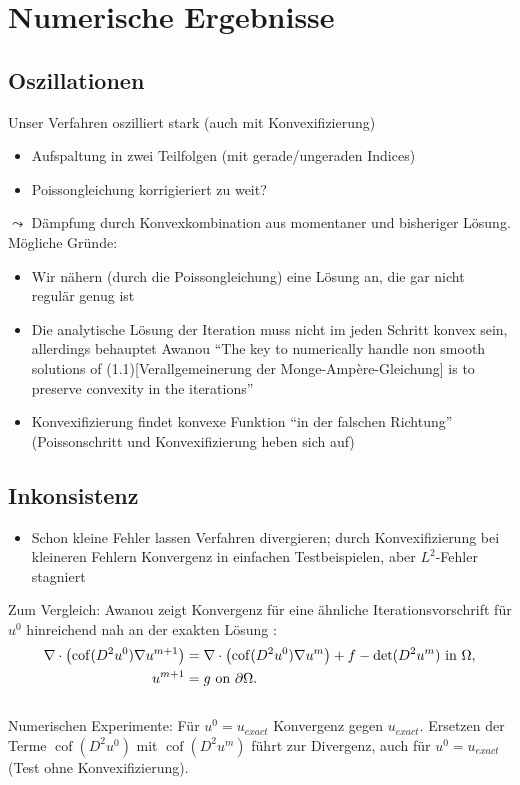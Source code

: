 \documentclass[a4paper,11pt]{article}
\newcommand{\cof}{\operatorname{cof}}
\begin{document}
\section*{Numerische Ergebnisse}

\subsection*{Oszillationen}

Unser Verfahren oszilliert stark (auch mit Konvexifizierung)
\begin{itemize}
	\item Aufspaltung in zwei Teilfolgen (mit gerade/ungeraden Indices)
	\item Poissongleichung korrigieriert zu weit?
\end{itemize}
 $\leadsto$ Dämpfung durch Konvexkombination aus momentaner und bisheriger Lösung.
Mögliche Gründe:
\begin{itemize}
	\item Wir nähern (durch die Poissongleichung) eine Lösung an, die gar nicht regulär genug ist
	\item Die analytische Lösung der Iteration muss nicht im jeden Schritt konvex sein, allerdings behauptet Awanou ``The key to numerically handle non smooth solutions	of (1.1)[Verallgemeinerung der Monge-Amp\`ere-Gleichung] is to preserve convexity in the iterations'' \cite{Awanou2014}
	\item Konvexifizierung findet konvexe Funktion ``in der falschen Richtung'' (Poissonschritt und Konvexifizierung heben sich auf)
\end{itemize}

\subsection*{Inkonsistenz}
\begin{itemize}
	\item Schon kleine Fehler lassen Verfahren divergieren; durch Konvexifizierung bei kleineren Fehlern Konvergenz in einfachen Testbeispielen, aber $L^2$-Fehler stagniert
\end{itemize}

Zum Vergleich: Awanou zeigt Konvergenz für eine ähnliche Iterationsvorschrift für $u^0$ hinreichend nah an der exakten Lösung \cite{Awanou2014}:
\begin{align*}
	\nabla \cdot \left( \cof(D^2 u^0) \nabla u^{m+1} \right) &= \nabla \cdot \left( \cof(D^2 u^0) \nabla u^{m} \right) + f - \operatorname{det} (D^2u^m) \textnormal{ in } \Omega, \\
	u^{m+1} &= g \textnormal{ on } \partial \Omega. 
\end{align*}
\\
Numerischen Experimente: Für $u^0=u_{exact}$  Konvergenz gegen $u_{exact}$. Ersetzen der Terme $\cof(D^2 u^0)$ mit $\cof(D^2 u^m)$ führt zur Divergenz, auch für $u^0=u_{exact}$ (Test ohne Konvexifizierung).
\end{document}

